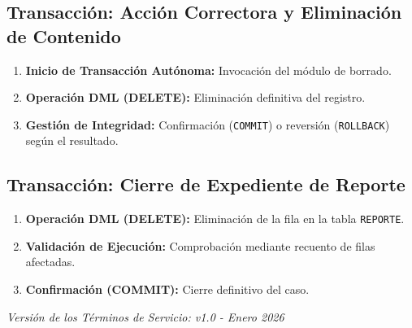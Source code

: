 \subsection{Transacción: Acción Correctora y Eliminación de Contenido}
\begin{enumerate}
    \item \textbf{Inicio de Transacción Autónoma:} Invocación del módulo de borrado.
    \item \textbf{Operación DML (DELETE):} Eliminación definitiva del registro.
    \item \textbf{Gestión de Integridad:} Confirmación (\texttt{COMMIT}) o reversión (\texttt{ROLLBACK}) según el resultado.
\end{enumerate}

\subsection{Transacción: Cierre de Expediente de Reporte}
\begin{enumerate}
    \item \textbf{Operación DML (DELETE):} Eliminación de la fila en la tabla \texttt{REPORTE}.
    \item \textbf{Validación de Ejecución:} Comprobación mediante recuento de filas afectadas.
    \item \textbf{Confirmación (COMMIT):} Cierre definitivo del caso.
\end{enumerate}

\vspace{1cm}
\begin{flushright}
    \textit{Versión de los Términos de Servicio: v1.0 - Enero 2026}
\end{flushright}